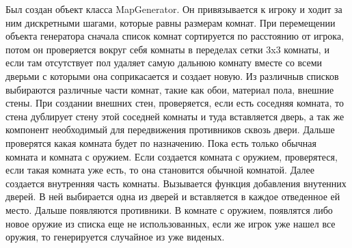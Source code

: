 \documentclass[14pt, titlepage,fleqn,a4paper]{extarticle}
\begin{document}
	Был создан объект класса MapGenerator. Он привязывается к игроку и ходит за ним дискретными шагами, которые равны размерам комнат. При перемещении объекта генератора сначала список комнат сортируется по расстоянию от игрока, потом он проверяется вокруг себя комнаты в переделах сетки 3x3 комнаты, и если там отсутствует пол удаляет самую дальнюю комнату вместе со всеми дверьми с которыми она соприкасается и создает новую. Из различныв списков выбираются различные части комнат, такие как обои, материал пола, внешние стены. При создании внешних стен, проверяется, если есть соседняя комната, то стена дублирует стену этой соседней комнаты и туда вставляется дверь, а так же компонент необходимый для передвижения противников сквозь двери. Дальше проверятся какая комната будет по назначению. Пока есть только обычная комната и комната с оружием. Если создается комната с оружием, проверятеся, если такая комната уже есть, то она становится обычной комнатой. Далее создается внутренняя часть комнаты. Вызывается функция добавления внутенних дверей. В ней выбирается одна из дверей и вставляется в каждое отведенное ей место. Дальше появляются противники. В комнате с оружием, появлятся либо новое оружие из списка еще не использованных, если же игрок уже нашел все оружия, то генерируется случайное из уже виденых.
\end{document}
